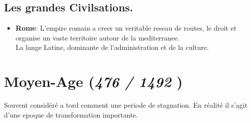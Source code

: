 \documentclass[a4paper,12pt]{article}
\begin{document}
\subsection{Les grandes Civilsations.}
\begin{itemize}
    \item \textbf{Rome}: L'empire romain a creer un veritable reseau de routes, le droit et organise un vaste territoire autour de la mediterranee. \\
    La lange Latine, dominante de l'administration et de la culture.
\end{itemize}

\section{Moyen-Age (\textit{476 / 1492} )}
Souvent considéré a tord comment une periode de stagnation. En réalité il s'agit d'une epoque de transformation importante.

\subsection{}
\end{document}
